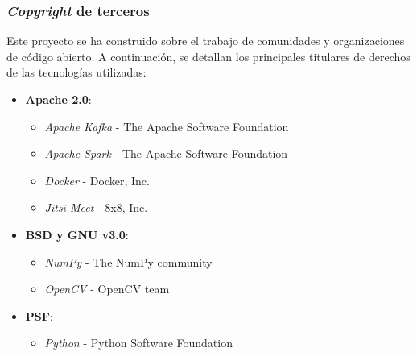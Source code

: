 \subsubsection{\textit{Copyright} de terceros}
Este proyecto se ha construido sobre el trabajo de comunidades y organizaciones de código abierto. A continuación, se detallan los principales titulares de derechos de las tecnologías utilizadas:
\begin{itemize}
	\item \textbf{Apache 2.0}:
	    \begin{itemize}
	        \item \textit{Apache Kafka} - The Apache Software Foundation
	        \item \textit{Apache Spark} - The Apache Software Foundation
	        \item \textit{Docker} - Docker, Inc.
	        \item \textit{Jitsi Meet} - 8x8, Inc.
	    \end{itemize}
	\item \textbf{BSD y GNU v3.0}:
	    \begin{itemize}
	        \item \textit{NumPy} - The NumPy community
	        \item \textit{OpenCV} - OpenCV team
	    \end{itemize}
    \item \textbf{PSF}:
	    \begin{itemize}
	        \item \textit{Python} - Python Software Foundation
	    \end{itemize}
\end{itemize}